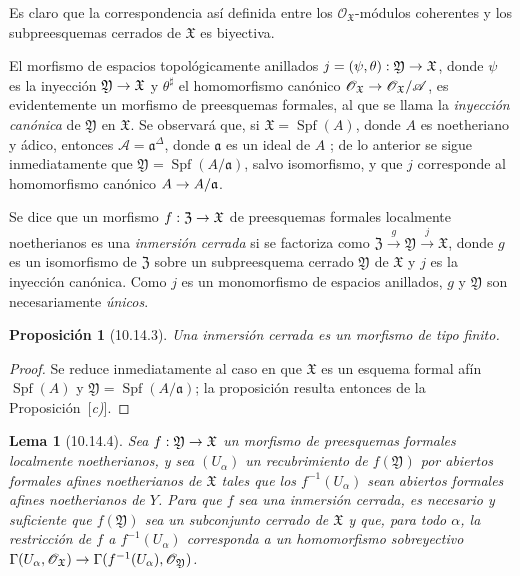 \documentclass[oneside]{amsart}
\theoremstyle{ega-env-style}
\theoremstyle{ega-thm-env-style}
\newtheorem*{proposition}{Proposición}
\newtheorem*{lemma}{Lema}
\theoremstyle{ega-defn-env-style}
\renewcommand{\to}{\mathchoice{\longrightarrow}{\rightarrow}{\rightarrow}{\rightarrow}}
\let\EGAOriginalLabel\label
\renewcommand{\label}[1]{\phantomsection\EGAOriginalLabel{#1}}
\begin{document}
Es claro que la correspondencia así definida entre los $\mathscr{O}_{\mathfrak{X}}$-módulos coherentes y los subpreesquemas cerrados de $\mathfrak{X}$ es biyectiva.

El morfismo de espacios topológicamente anillados $j=(\psi,\theta):\mathfrak{Y}\to\mathfrak{X}$, donde $\psi$ es la inyección $\mathfrak{Y}\to\mathfrak{X}$ y $\theta^\sharp$ el homomorfismo canónico $\mathscr{O}_{\mathfrak{X}}\to\mathscr{O}_{\mathfrak{X}}/\mathscr{A}$, es evidentemente  un morfismo de preesquemas formales, al que se llama la \emph{inyección canónica} de $\mathfrak{Y}$ en $\mathfrak{X}$.
Se observará que, si $\mathfrak{X}=\operatorname{Spf}(A)$, donde $A$ es noetheriano y ádico, entonces $\mathscr{A}=\mathfrak{a}^\Delta$, donde $\mathfrak{a}$ es un ideal de $A$ ; de lo anterior se sigue inmediatamente que $\mathfrak{Y}=\operatorname{Spf}(A/\mathfrak{a})$, salvo isomorfismo, y que $j$ corresponde  al homomorfismo canónico $A\to A/\mathfrak{a}$.

Se dice que un morfismo $f:\mathfrak{Z}\to\mathfrak{X}$ de preesquemas formales localmente noetherianos es una \emph{inmersión cerrada} si se factoriza como $\mathfrak{Z}\xrightarrow{g}\mathfrak{Y}\xrightarrow{j}\mathfrak{X}$, donde $g$ es un isomorfismo de $\mathfrak{Z}$ sobre un subpreesquema cerrado $\mathfrak{Y}$ de $\mathfrak{X}$ y $j$ es la inyección canónica.
Como $j$ es un monomorfismo de espacios anillados, $g$ y $\mathfrak{Y}$ son necesariamente \emph{únicos}.

\begin{proposition}[10.14.3]
\label{I.10.14.3}
Una inmersión cerrada es un morfismo de tipo finito.
\end{proposition}

\begin{proof}
Se reduce inmediatamente al caso en que $\mathfrak{X}$ es un esquema formal afín $\operatorname{Spf}(A)$ y $\mathfrak{Y}=\operatorname{Spf}(A/\mathfrak{a})$;
la proposición resulta entonces de la Proposición~[\emph{c)}].
\end{proof}

\begin{lemma}[10.14.4]
\label{I.10.14.4}
Sea $f:\mathfrak{Y}\to\mathfrak{X}$ un morfismo de preesquemas formales localmente noetherianos, y sea $(U_\alpha)$ un recubrimiento de $f(\mathfrak{Y})$ por abiertos formales afines noetherianos de $\mathfrak{X}$ tales que los $f^{-1}(U_\alpha)$ sean abiertos formales afines noetherianos de $Y$.
Para que $f$ sea una inmersión cerrada, es necesario y suficiente que $f(\mathfrak{Y})$ sea un subconjunto cerrado de $\mathfrak{X}$ y que, para todo $\alpha$, la restricción de $f$ a $f^{-1}(U_\alpha)$ corresponda  a un homomorfismo sobreyectivo $\Gamma(U_\alpha,\mathscr{O}_{\mathfrak{X}})\to
\Gamma(f^{-1}(U_\alpha),\mathscr{O}_{\mathfrak{Y}})$.
\end{lemma}
\end{document}
